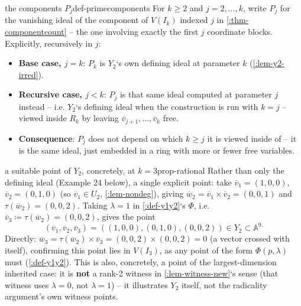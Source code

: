 \documentclass[a4paper,11pt]{scrartcl}
\begin{document}
\begin{definition}{the components \(P_{j}\)}{def-primecomponents} For \(k \geq 2\) and \(j = 2,\ldots,k\), write \(P_{j}\) for the vanishing ideal of the component of \(V\left( I_{k} \right)\) indexed \(j\) in \cref{:thm-componentcount} -- the one involving exactly the first \(j\) coordinate blocks. Explicitly, recursively in \(j\):

\begin{itemize}
\item
  \textbf{Base case, \(j = k\)}: \(P_{k}\) is \(Y_{2}\)`s own defining ideal at parameter \(k\) (\cref{:lem-y2-irred}).
\item
  \textbf{Recursive case, \(j < k\)}: \(P_{j}\) is that same ideal computed at parameter \(j\) instead -- i.e. \(Y_{2}\)`s defining ideal when the construction is run with \(k = j\) -- viewed inside \(R_{k}\) by leaving \({\overline{v}}_{j + 1},\ldots,{\overline{v}}_{k}\) free.
\item
  \textbf{Consequence}: \(P_{j}\) does not depend on which \(k \geq j\) it is viewed inside of -- it is the same ideal, just embedded in a ring with more or fewer free variables.
\end{itemize}

\end{definition} \protect{}\label{def-primecomponents}{}

\begin{example}{a suitable point of \(Y_{2}\), concretely, at \(k = 3\)}{prop-rational} Rather than only the defining ideal (Example 24 below), a single explicit point: take \({\overline{v}}_{1} = (1,0,0)\), \({\overline{v}}_{2} = (0,1,0)\) (so \({\overline{v}}_{1} \in U_{2}\), \cref{:lem-nondeg}), giving \({\overline{w}}_{2} = {\overline{v}}_{1} \times {\overline{v}}_{2} = (0,0,1)\) and \(\tau({\overline{w}}_{2}) = (0,0,2)\). Taking \(\lambda = 1\) in \cref{:def-y1y2}`s \(\Phi\), i.e. \({\overline{v}}_{3} ≔ \tau({\overline{w}}_{2}) = (0,0,2)\), gives the point \[\left( {\overline{v}}_{1},{\overline{v}}_{2},{\overline{v}}_{3} \right) = \left( (1,0,0),(0,1,0),(0,0,2) \right) \in Y_{2} \subset \mathbb{A}^{9.}\] Directly: \({\overline{w}}_{3} = \tau({\overline{w}}_{2}) \times {\overline{v}}_{3} = (0,0,2) \times (0,0,2) = 0\) (a vector crossed with itself), confirming this point lies in \(V\left( I_{3} \right)\), as any point of the form \(\Phi(p,\lambda)\) must (\cref{:def-y1y2}). This is also, concretely, a point of the largest-dimension inherited case: it is \textbf{not} a rank-2 witness in \cref{:lem-witness-new}`s sense (that witness uses \(\lambda = 0\), not \(\lambda = 1\)) -- it illustrates \(Y_{2}\) itself, not the radicality argument's own witness points.

\end{example}
\end{document}
